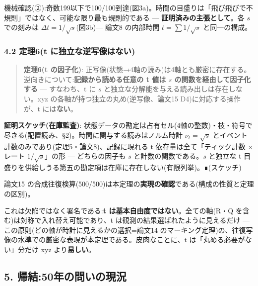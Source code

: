 \documentclass[
]{ltjsarticle}
\begin{document}
機械確認(②):奇数199以下で100/100到達(図3a)。時間の目盛りは「飛び飛びで不規則」ではなく、可能な限り最も規則的である
--- \textbf{証明済みの主張として}。各 \(s\) での刻みは
\(\Delta t=1/\sqrt{s}\)(図3b)--- 論文8 の内部時間 \(t=\sum 1/\sqrt{s}\)
と同一の構成。

\subsubsection{4.2 定理6(t
に独立な逆写像はない)}\label{ux5b9aux74066t-ux306bux72ecux7acbux306aux9006ux5199ux50cfux306fux306aux3044}

\begin{quote}
\textbf{定理6(t の因子化)}:
正写像(状態→4軸の読み)は4軸とも厳密に存在する。逆向きについて:\textbf{記録から読める任意の
t 値は \(s\) の関数を経由して因子化する} --- すなわち、t に \(s\)
と独立な分解能を与える読み出しは存在しない。xyz
の各軸が持つ独立の丸め(逆写像、論文15 D4)に対応する操作が、t
には\textbf{ない}。
\end{quote}

\textbf{証明スケッチ(在庫監査)}:
状態データの勘定は占有セル(4軸の整数)・枝・符号で尽きる(配置読み、§2)。時間に関与する読みはノルム時計
\(\nu_t=\sqrt{s}\) とイベント計数のみであり(定理5・論文8)、記録に現れる
t 依存量は全て「ティック計数 × レート \(1/\sqrt{s}\)」の形 ---
どちらの因子も \(s\) と計数の関数である。\(s\) と独立な t
目盛りを供給しうる第五の勘定項は在庫に存在しない(有限列挙)。∎(スケッチ)

論文15
の合成往復検算(500/500)は本定理の\textbf{実現の確認}である(構成の性質と定理の区別)。

これは欠陥ではなく署名である:\textbf{t
は基本自由度ではない}。全ての軸(R・Q
を含む)は対称で入れ替え可能であり、t
は観測の結果選ばれたように見えるだけ ---
この原則(どの軸が時計に見えるかの選択=論文14
のマーキング定理)の、往復写像の水準での厳密な表現が本定理である。皮肉なことに、t
は「丸める必要がない」分だけ xyz より\textbf{易しい}。

\subsection{5.
帰結:50年の問いの現況}\label{ux5e30ux7d5050ux5e74ux306eux554fux3044ux306eux73feux6cc1}
\end{document}
